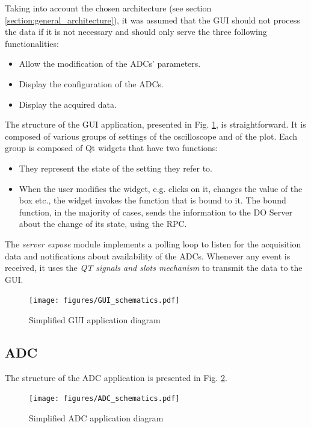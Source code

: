         Taking into account the chosen architecture (see section \ref{section:general_architecture}), it was assumed that the GUI should not process the data if it is not necessary and should only serve the three following functionalities:
        \begin{itemize}
            \item Allow the modification of the ADCs' parameters.
            \item Display the configuration of the ADCs.
            \item Display the acquired data.
        \end{itemize}
        The structure of the GUI application, presented in Fig. \ref{fig:gui_structure}, is straightforward. It is composed of various groups of settings of the oscilloscope and of the plot. Each group is composed of Qt widgets that have two functions:
        \begin{itemize}
            \item They represent the state of the setting they refer to.
            \item When the user modifies the widget, e.g. clicks on it, changes the value of the box etc., the widget invokes the function that is bound to it. The bound function, in the majority of cases, sends the information to the DO Server about the change of its state, using the RPC.
        \end{itemize}
        
        The \textit{server expose} module implements a polling loop to listen for the acquisition data and notifications about availability of the ADCs. Whenever any event is received, it uses the \textit{QT signals and slots mechanism} to transmit the data to the GUI.
        
        \begin{figure}
        	\centerline{\texttt{[image: figures/GUI\_schematics.pdf]}}
        	\caption{Simplified GUI application diagram}
        	\label{fig:gui_structure}
        \end{figure}
    
    \subsection{ADC} \label{section:do_adc_app}
        The structure of the ADC application is presented in Fig. \ref{fig:adc_structure}.
        \begin{figure}
        	\centerline{\texttt{[image: figures/ADC\_schematics.pdf]}}
        	\caption{Simplified ADC application diagram}
            	\label{fig:adc_structure}
        \end{figure}
        
